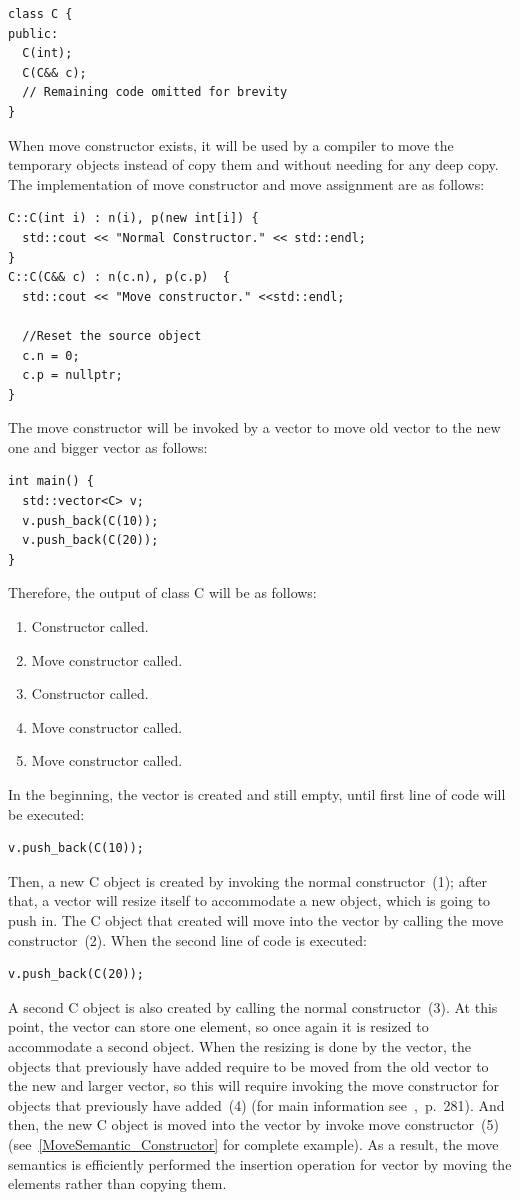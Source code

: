 \documentclass[11pt]{report}
\begin{document}
\begin{lstlisting}
class C {
public:
  C(int);
  C(C&& c);
  // Remaining code omitted for brevity
}
\end{lstlisting}
When move constructor exists, it will be used by a compiler to move the temporary objects instead of copy them and without needing for any deep copy. The implementation of move constructor and move assignment are as follows:
\begin{lstlisting}
C::C(int i) : n(i), p(new int[i]) {
  std::cout << "Normal Constructor." << std::endl;
}
C::C(C&& c) : n(c.n), p(c.p)  {
  std::cout << "Move constructor." <<std::endl;

  //Reset the source object
  c.n = 0;
  c.p = nullptr;
}
\end{lstlisting}
The move constructor will be invoked by a vector to move old vector to the new one and bigger vector as follows:
\begin{lstlisting}
int main() {
  std::vector<C> v;
  v.push_back(C(10));
  v.push_back(C(20));
}
\end{lstlisting}
Therefore, the output of class C will be as follows:
\begin{enumerate}
\item Constructor called.
\item Move constructor called.
\item Constructor called.
\item Move constructor called.
\item Move constructor called.
\end{enumerate}
In the beginning, the vector is created and still empty, until first line of code will be executed:
\begin{lstlisting}
v.push_back(C(10));
\end{lstlisting}
Then, a new C object is created by invoking the normal constructor~(1); after that, a vector will resize itself to accommodate a new object, which is going to push in. The C object that created will move into the vector by calling the move constructor~(2). When the second line of code is executed:
\begin{lstlisting}
v.push_back(C(20));
\end{lstlisting}
A second C object is also created by calling the normal constructor~(3). At this point, the vector can store one element, so once again it is resized to accommodate a second object. When the resizing is done by the vector, the objects that previously have added require to be moved from the old vector to the new and larger vector, so this will require invoking the move constructor for objects that previously have added~(4) (for main information see~\cite{Gregorie:professionalcpp},~p.~281). And then, the new C object is moved into the vector by invoke move constructor~(5) (see~\ref{MoveSemantic_Constructor} for complete example). As a result, the move semantics is efficiently performed the insertion operation for vector by moving the elements rather than copying them.
\end{document}
